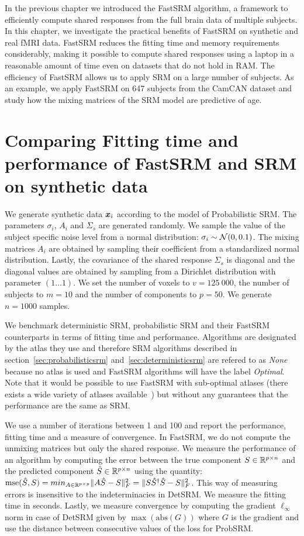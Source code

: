In the previous chapter we introduced the FastSRM algorithm, a framework to
efficiently compute shared responses from the full brain data of multiple
subjects. In this chapter, we
investigate the practical benefits of FastSRM on synthetic and real fMRI data.
FastSRM reduces the fitting time
and memory requirements considerably, making it possible to compute
shared responses using a laptop in a reasonable amount of time even on
datasets that do not hold in RAM. The efficiency of FastSRM allows us to apply
SRM on a large number of subjects. As an example, we apply FastSRM on 647
subjects from the CamCAN dataset and study how the mixing matrices of the SRM
model are predictive of age.


\section{Comparing Fitting time and performance of FastSRM and
  SRM on synthetic data}
We generate synthetic data $\boldsymbol{x}_i$ according to the model of Probabilistic SRM.
The parameters $\sigma_i$, $A_i$ and $\Sigma_s$ are generated randomly. We sample the value of the subject specific noise level from a normal
distribution: $\sigma_i \sim \mathcal{N}(0, 0.1)$. The mixing matrices $A_i$
are obtained by sampling their coefficient from a standardized normal distribution.
Lastly, the covariance of the shared response $\Sigma_s$ is diagonal and the
diagonal values are obtained by sampling from a Dirichlet distribution with
parameter $(1 \dots 1)$.
We set the number of voxels to $v=125~000$, the number of subjects to $m=10$ and
the number of components to $p=50$. We generate $n=1000$ samples.

We benchmark deterministic SRM, probabilistic
SRM and their FastSRM counterparts in terms of fitting time and performance.
Algorithms are designated by the atlas they use and therefore SRM algorithms described in
section~\ref{sec:probabilisticsrm} and~\ref{sec:deterministicsrm} are refered to
as \emph{None} because no atlas is used and FastSRM algorithms will have the
label \emph{Optimal}. Note that it would be possible to use FastSRM with sub-optimal
atlases (there exists a wide variety of atlases
available~\cite{schaefer2017local, bellec2010multi, mensch2018extracting}) but
without any guarantees that the performance are the same as SRM.


We use a number of iterations between 1 and 100 and report the performance,
fitting time and a measure of convergence. In FastSRM, we do not compute the
unmixing matrices but only the shared response.
We measure the performance of an algorithm by computing the error between the true component $S \in \mathbb{R}^{p \times n}$ and
the predicted component $\hat{S} \in \mathbb{R}^{p \times n}$ using the quantity:
$\mathrm{mse}(\hat{S}, S) = min_{A \in \mathbb{R}^{p \times p}} \|A \hat{S} - S \|^2_F =  \|S
\hat{S}^{\dagger}\hat{S} - S \|^2_F$. This way of measuring errors is
insensitive to the indeterminacies in DetSRM.
We measure the fitting time in seconds.
Lastly, we measure convergence by computing the gradient $\ell_{\infty}$ norm in
case of DetSRM given by $\max(\mathrm{abs}(G))$ where $G$ is the gradient and
use the distance between consecutive values of the loss for ProbSRM.

